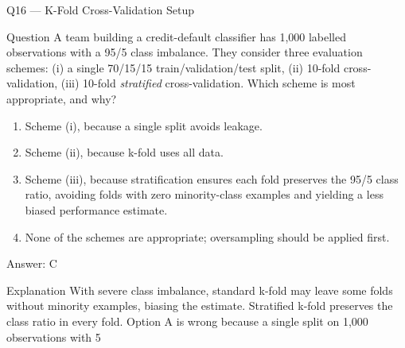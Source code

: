 \documentclass[aspectratio=169,8pt]{beamer}
\begin{document}
	\begin{frame}{Q16 --- K-Fold Cross-Validation Setup}
		\begin{block}{Question}
			A team building a credit-default classifier has 1,000 labelled observations with a 95/5 class imbalance. They consider three evaluation schemes: (i) a single 70/15/15 train/validation/test split, (ii) 10-fold cross-validation, (iii) 10-fold \emph{stratified} cross-validation. Which scheme is most appropriate, and why?
		\end{block}
		\begin{enumerate}
			\item Scheme (i), because a single split avoids leakage.
			\item Scheme (ii), because k-fold uses all data.
			\item Scheme (iii), because stratification ensures each fold preserves the 95/5 class ratio, avoiding folds with zero minority-class examples and yielding a less biased performance estimate.
			\item None of the schemes are appropriate; oversampling should be applied first.
		\end{enumerate}
		\begin{exampleblock}{Answer: C}\end{exampleblock}
		\begin{block}{Explanation}
			With severe class imbalance, standard k-fold may leave some folds without minority examples, biasing the estimate. Stratified k-fold preserves the class ratio in every fold. Option A is wrong because a single split on 1,000 observations with 5%
		\end{block}
	\end{frame}
	
\end{document}
